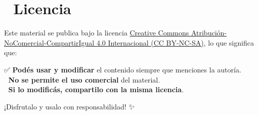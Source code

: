 \documentclass[
  letterpaper,
  DIV=11,
  numbers=noendperiod]{scrreprt}
\begin{document}
\chapter{📜 Licencia}\label{licencia}

Este material se publica bajo la licencia
\href{https://creativecommons.org/licenses/by-nc-sa/4.0/}{Creative
Commons Atribución-NoComercial-CompartirIgual 4.0 Internacional (CC
BY-NC-SA)}, lo que significa que:

✅ \textbf{Podés usar y modificar} el contenido siempre que menciones la
autoría.\\
🚫 \textbf{No se permite el uso comercial} del material.\\
🔄 \textbf{Si lo modificás, compartilo con la misma licencia}.

¡Disfrutalo y usalo con responsabilidad! ✨
\end{document}

